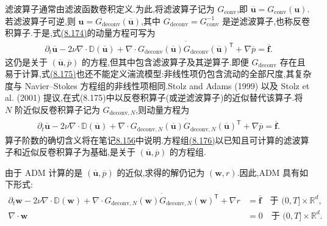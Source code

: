 \begin{note}[基本思想]
滤波算子通常由滤波函数卷积定义.为此,将滤波算子记为 $G_{\mathrm{conv}}$,即 $\overline{\bm{u}}=G_{\mathrm{conv}}(\bm{u})$.若滤波算子可逆,则
$\bm{u}=G_{\mathrm{deconv}}(\overline{\bm{u}})$,其中
$G_{\mathrm{deconv}}=G_{\mathrm{conv}}^{-1}$ 是逆滤波算子,也称反卷积算子.于是,式\hyperref[eq:les-adm-filtered-ns]{(8.174)}的动量方程可写为
\begin{equation}\label{eq:les-adm-exact-deconvolution}
\begin{aligned}
 \partial_t\overline{\bm{u}}
 -2\nu\nabla\cdot\mathbb{D}(\overline{\bm{u}})
 +\nabla\cdot\overline{
  G_{\mathrm{deconv}}(\overline{\bm{u}})
  G_{\mathrm{deconv}}(\overline{\bm{u}})^{\mathsf T}}
 +\nabla\overline{p}
 =\overline{\bm{f}}.
\end{aligned}
\end{equation}
这仍是关于 $(\overline{\bm{u}},\overline{p})$ 的方程,但其中包含滤波算子及其逆算子.即便 $G_{\mathrm{deconv}}$ 存在且易于计算,式\hyperref[eq:les-adm-exact-deconvolution]{(8.175)}也还不能定义湍流模型:非线性项仍包含流动的全部尺度,其复杂度与 Navier--Stokes 方程组的非线性项相同.Stolz and Adams (1999) 以及 Stolz et al. (2001) 提议,在式(8.175)中以反卷积算子(或逆滤波算子)的近似替代该算子.将 $N$ 阶近似反卷积算子记为 $G_{\mathrm{deconv},N}$,则动量方程为
\begin{equation}\label{eq:les-adm-approximate-deconvolution}
\begin{aligned}
 \partial_t\overline{\bm{u}}
 -2\nu\nabla\cdot\mathbb{D}(\overline{\bm{u}})
 +\nabla\cdot\overline{
  G_{\mathrm{deconv},N}(\overline{\bm{u}})
  G_{\mathrm{deconv},N}(\overline{\bm{u}})^{\mathsf T}}
 +\nabla\overline{p}
 =\overline{\bm{f}}.
\end{aligned}
\end{equation}
算子阶数的确切含义将在笔记\hyperref[note:van-cittert-approximate-deconvolution]{8.156}中说明.方程组\hyperref[eq:les-adm-approximate-deconvolution]{(8.176)}以已知且可计算的滤波算子和近似反卷积算子为基础,是关于 $(\overline{\bm{u}},\overline{p})$ 的方程组.

由于 ADM 计算的是 $(\overline{\bm{u}},\overline{p})$ 的近似,求得的解仍记为 $(\bm{w},r)$.因此,ADM 具有如下形式:
\begin{equation}\label{eq:les-adm-model}
\begin{aligned}
 \partial_t\bm{w}
 -2\nu\nabla\cdot\mathbb{D}(\bm{w})
 +\nabla\cdot\overline{
  G_{\mathrm{deconv},N}(\bm{w})
  G_{\mathrm{deconv},N}(\bm{w})^{\mathsf T}}
 +\nabla r
 &=\overline{\bm{f}}
 \quad\text{于 }(0,T]\times\mathbb{R}^d,\\
 \nabla\cdot\bm{w}&=0
 \quad\text{于 }(0,T]\times\mathbb{R}^d.
\end{aligned}
\end{equation}
\end{note}

